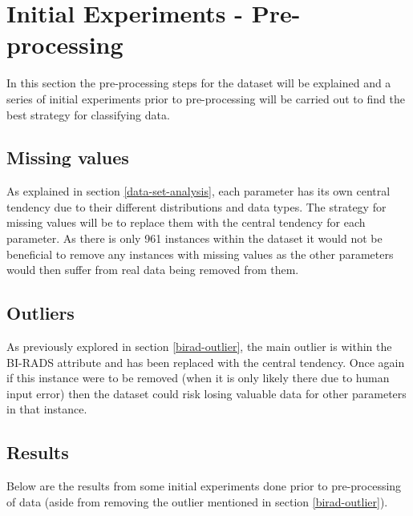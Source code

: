 \documentclass[12pt]{article}
\begin{document}
\section{Initial Experiments - Pre-processing}
  In this section the pre-processing steps for the dataset will be explained and a series of initial experiments prior to pre-processing will be carried out to find the best strategy for classifying data.

  \subsection{Missing values}
    As explained in section \ref{data-set-analysis}, each parameter has its own central tendency due to their different distributions and data types. The strategy for missing values will be to replace them with the central tendency for each parameter. As there is only 961 instances within the dataset it would not be beneficial to remove any instances with missing values as the other parameters would then suffer from real data being removed from them.

  \subsection{Outliers}
    As previously explored in section \ref{birad-outlier}, the main outlier is within the BI-RADS attribute and has been replaced with the central tendency. Once again if this instance were to be removed (when it is only likely there due to human input error) then the dataset could risk losing valuable data for other parameters in that instance.

  \subsection{Results}
    Below are the results from some initial experiments done prior to pre-processing of data (aside from removing the outlier mentioned in section \ref{birad-outlier}).
\end{document}
